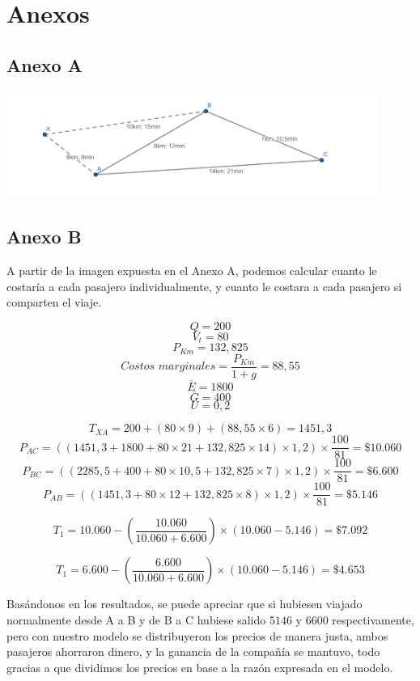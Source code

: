 \documentclass[12pt]{report}
\begin{document}
\newpage
\section*{Anexos}

\subsection*{Anexo A}
\includegraphics[width=460px]{imagen.png}

\subsection*{Anexo B}
A partir de la imagen expuesta en el Anexo A, podemos calcular cuanto le costaría a cada pasajero individualmente, y cuanto le costara a cada pasajero si comparten el viaje.

$$Q=200$$
$$V_{t}=80$$
$$P_{Km}=132,825$$
$$Costos\, \, marginales = \frac{P_{Km}}{1+g}=88,55$$
$$\overline{E}=1800$$
$$\overline{G}=400$$
$$U=0,2$$

$$T_{XA}=200+(80 \times 9)+(88,55 \times 6)=1451,3$$
$$P_{AC}=((1451,3+1800+80\times 21 + 132,825 \times 14)\times 1,2)\times \frac{100}{81}=\$10.060$$
$$P_{BC}=((2285,5+400+80\times 10,5 + 132,825 \times 7)\times 1,2)\times \frac{100}{81}=\$6.600$$
$$P_{AB}=((1451,3+80\times 12 + 132,825 \times 8)\times 1,2)\times \frac{100}{81}=\$5.146$$

$$T_{1}=10.060-(\frac{10.060}{10.060+6.600})\times (10.060-5.146)=\$7.092$$

$$T_{1}=6.600-(\frac{6.600}{10.060+6.600})\times (10.060-5.146)=\$4.653$$

Basándonos en los resultados, se puede apreciar que si hubiesen viajado normalmente desde A a B y de B a C hubiese salido $5146$ y $6600$ respectivamente, pero con nuestro modelo se distribuyeron los precios de manera justa, ambos pasajeros ahorraron dinero, y la ganancia de la compañía se mantuvo, todo gracias a que dividimos los precios en base a la razón expresada en el modelo.
\end{document}
